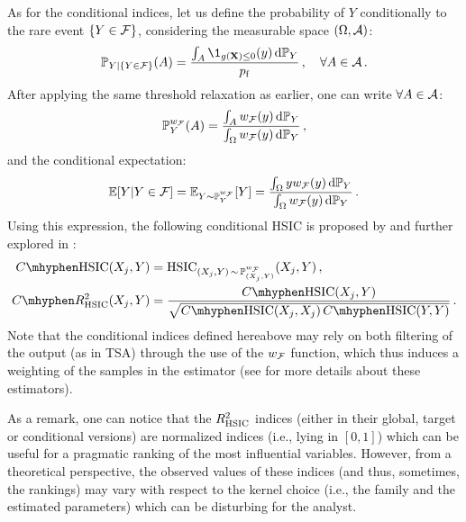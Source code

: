 As for the conditional indices, let us define the probability of $Y$ conditionally to the rare event $\{Y \in \mathcal{F}\}$, considering the measurable space $(\Omega, \mathcal{A})$:
\begin{equation}
    \P_{Y|\{Y\in\iF\}}(A) = \frac{\int_{A} \1_{g(\bX)\leq0}(y) \, \dd \P_Y}{\pf}\,, \quad \forall A \in \iA\,.
\end{equation}
After applying the same threshold relaxation as earlier, one can write $\forall A \in \mathcal{A}$: 
\begin{equation}
    \mathbb{P}_Y^{w_{\mathcal{F}}}(A)= \frac{\int_A w_{\mathcal{F}}(y) \, \mathrm{d} \mathbb{P}_Y}{\int_{\Omega} w_{\mathcal{F}}(y) \, \mathrm{d} \mathbb{P}_Y} \, ,
\end{equation}
and the conditional expectation: 
\begin{equation}
    \mathbb{E}[Y|Y \in \mathcal{F}] = \mathbb{E}_{Y\sim\mathbb{P}_Y^{w_{\mathcal{F}}}}[Y] = \frac{\int_\Omega y w_{\mathcal{F}}(y) \, \mathrm{d} \mathbb{P}_Y}{\int_{\Omega} w_{\mathcal{F}}(y) \, \mathrm{d} \mathbb{P}_Y}\, .
\end{equation}
Using this expression, the following conditional HSIC is proposed by \citet{marrel_2018} and further explored in \citet{marrel_chabridon_2021}:
\begin{subequations}
    \begin{align}
        C \mhyphen \HSIC(X_j, Y) & = \HSIC_{(X_j, Y) \,\sim\, \P_{(X_j, Y)}^{w_{\iF}}} (X_j, Y) \, ,\\
        C \mhyphen R^2_{\HSIC}(X_j, Y) &= \frac{C \mhyphen \HSIC(X_j, Y)}{\sqrt{C \mhyphen \HSIC(X_j, X_j) \, C \mhyphen \HSIC(Y, Y)}}\, .
    \end{align}
\end{subequations}
Note that the conditional indices defined hereabove may rely on both filtering of the output (as in TSA) through the use of the $w_{\mathcal{F}}$ function, which thus induces a weighting of the samples in the estimator (see \citealp{marrel_chabridon_2021} for more details about these estimators).

As a remark, one can notice that the $R^2_{\mathrm{HSIC}}$ indices (either in their global, target or conditional versions) are normalized indices (i.e., lying in $[0,1]$) which can be useful for a pragmatic ranking of the most influential variables. 
However, from a theoretical perspective, the observed values of these indices (and thus, sometimes, the rankings) may vary with respect to the kernel choice (i.e., the family and the estimated parameters) which can be disturbing for the analyst.

